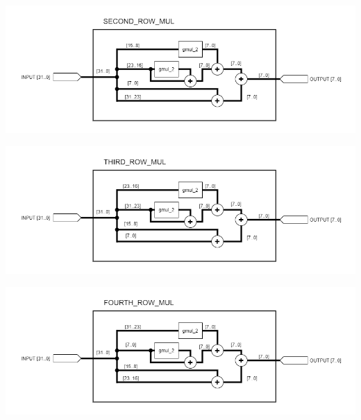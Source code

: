 \documentclass[a4paper, 10pt]{article}
\newenvironment{Figure}
    {\par\medskip\noindent\minipage{\linewidth}}
    {\endminipage\par\medskip}
\begin{document}
\begin{multicols}{2}
            \noindent
            \begin{Figure}
                \centering
                \includegraphics[width=\linewidth]{Second_Row_Mul.png}
                \label{fig:second-row-mul}
            \end{Figure}

            \noindent
            \begin{Figure}
                \centering
                \includegraphics[width=\linewidth]{Third_Row_Mul.png}
                \label{fig:third-row-mul}
            \end{Figure}

            \noindent
            \begin{Figure}
                \centering
                \includegraphics[width=\linewidth]{Fourth_Row_Mul.png}
                \label{fig:fourth-row-mul}
            \end{Figure}


\end{multicols}
\end{document}
